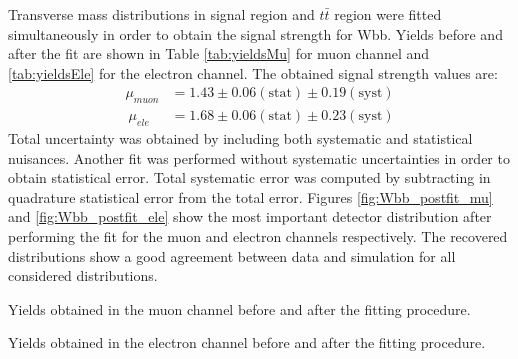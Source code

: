 Transverse mass distributions in signal region and $t\bar{t}$ region were fitted simultaneously in order to obtain the signal strength for Wbb. Yields before and after the fit are shown in Table \ref{tab:yieldsMu} for muon channel and \ref{tab:yieldsEle} for the electron channel. The obtained signal strength values are:
\begin{align*}
\mu_{muon} &= 1.43 \pm 0.06\mathrm{(stat)} \pm 0.19 \mathrm{(syst)}\\\
\mu_{ele} &= 1.68 \pm 0.06\mathrm{(stat)} \pm 0.23\mathrm{(syst)}
\end{align*}
Total uncertainty was obtained by including both systematic and statistical nuisances. Another fit was performed without systematic uncertainties in order to obtain statistical error. Total systematic error was computed by subtracting in quadrature statistical error from the total error. 
Figures \ref{fig:Wbb_postfit_mu} and \ref{fig:Wbb_postfit_ele} show the most important detector distribution after performing the fit for the muon and electron channels respectively. The recovered distributions show a good agreement between data and simulation for all considered distributions.

\begin{table}[h!]
\caption{Yields obtained in the muon channel before and after the fitting procedure.}
\label{tab:yieldsMu}

\end{table}
\begin{table}[h!]
\caption{Yields obtained in the electron channel before and after the fitting procedure.}
\label{tab:yieldsEle}

\end{table}


